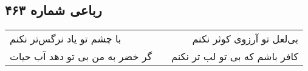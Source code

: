 \begin{center}
\section*{رباعی شماره ۴۶۳}
\label{sec:sh463}
\begin{longtable}{l p{0.5cm} r}
با چشم تو یاد نرگس‌تر نکنم
&&
بی‌لعل تو آرزوی کوثر نکنم
\\
گر خضر به من بی تو دهد آب حیات
&&
کافر باشم که بی تو لب تر نکنم
\\
\end{longtable}
\end{center}
